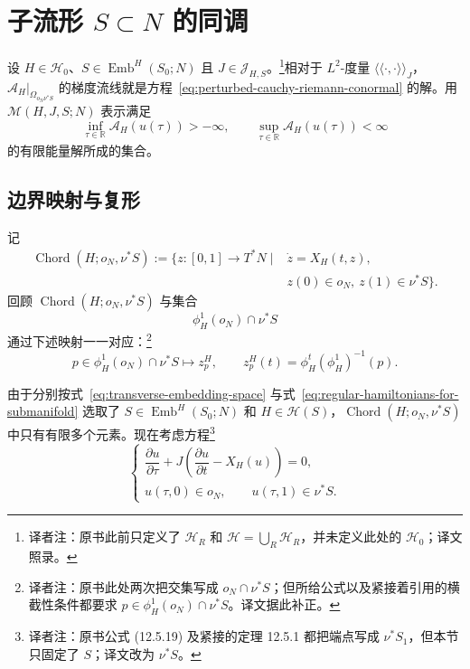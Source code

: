 \section{子流形 \texorpdfstring{$S\subset N$}{S ⊂ N} 的\personFloer{}同调}
\label{sec:floer-homology-submanifold}

设 $H\in\mathcal H_0$、$S\in\operatorname{Emb}^{H}(S_0;N)$ 且 $J\in\mathcal J_{H,S}$。\footnote{译者注：原书此前只定义了 $\mathcal H_R$ 和 $\mathcal H=\bigcup_R\mathcal H_R$，并未定义此处的 $\mathcal H_0$；译文照录。}相对于 $L^2$-度量 $\langle\!\langle\mathord\cdot,\mathord\cdot\rangle\!\rangle_J$，$\mathcal A_H|_{\Omega_{o_N\nu^*S}}$ 的梯度流线就是方程~\eqref{eq:perturbed-cauchy-riemann-conormal} 的解。用 $\mathcal M(H,J,S;N)$ 表示满足
\[
  \inf_{\tau\in\mathbb R}\mathcal A_H(u(\tau))>-\infty,
  \qquad
  \sup_{\tau\in\mathbb R}\mathcal A_H(u(\tau))<\infty
\]
的有限能量解所成的集合。

\subsection{边界映射与\personFloer{}复形}
\label{subsec:boundary-map-floer-complex}

记
\begin{equation}
\begin{split}
  \operatorname{Chord}(H;o_N,\nu^*S)
  :=\{z:[0,1]\to T^*N\mid {}&\dot z=X_H(t,z),\\
  &z(0)\in o_N,\ z(1)\in\nu^*S\}.
\end{split}
\label{eq:hamiltonian-chords-conormal}
\end{equation}
回顾 $\operatorname{Chord}(H;o_N,\nu^*S)$ 与集合
\[
  \phi_H^1(o_N)\cap\nu^*S
\]
通过下述映射一一对应：\footnote{译者注：原书此处两次把交集写成 $o_N\cap\nu^*S$；但所给公式以及紧接着引用的横截性条件都要求 $p\in\phi_H^1(o_N)\cap\nu^*S$。译文据此补正。}
\[
  p\in\phi_H^1(o_N)\cap\nu^*S
  \longmapsto z_p^H,
  \qquad
  z_p^H(t)=\phi_H^t(\phi_H^1)^{-1}(p).
\]

由于分别按式~\eqref{eq:transverse-embedding-space} 与式~\eqref{eq:regular-hamiltonians-for-submanifold} 选取了 $S\in\operatorname{Emb}^{H}(S_0;N)$ 和 $H\in\mathcal H(S)$，$\operatorname{Chord}(H;o_N,\nu^*S)$ 中只有有限多个元素。现在考虑\personFloer{}方程\footnote{译者注：原书公式 (12.5.19) 及紧接的定理 12.5.1 都把端点写成 $\nu^*S_1$，但本节只固定了 $S$；译文改为 $\nu^*S$。}
\begin{equation}
  \begin{cases}
    \dfrac{\partial u}{\partial\tau}
      +J\left(\dfrac{\partial u}{\partial t}-X_H(u)\right)=0,\\[6pt]
    u(\tau,0)\in o_N,\qquad u(\tau,1)\in\nu^*S.
  \end{cases}
\label{eq:floer-equation-zero-conormal}
\end{equation}

